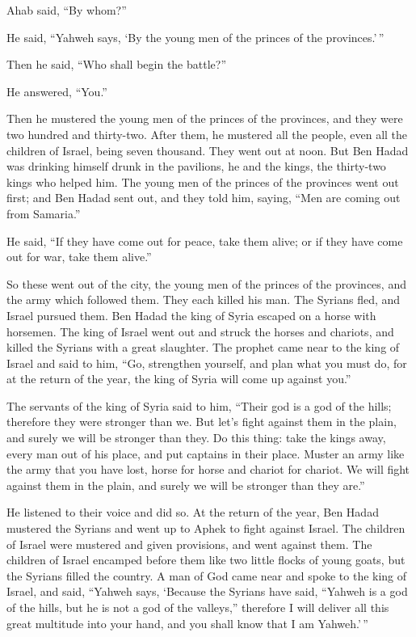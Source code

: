  Ahab said, ``By whom?''

He said, ``Yahweh says, `By the young men of the princes of the
provinces.'\,''

Then he said, ``Who shall begin the battle?''

He answered, ``You.''

 Then he mustered the young men of the princes of the
provinces, and they were two hundred and thirty-two. After them, he
mustered all the people, even all the children of Israel, being seven
thousand.  They went out at noon. But Ben Hadad was
drinking himself drunk in the pavilions, he and the kings, the
thirty-two kings who helped him.  The young men of the
princes of the provinces went out first; and Ben Hadad sent out, and
they told him, saying, ``Men are coming out from Samaria.''

 He said, ``If they have come out for peace, take them
alive; or if they have come out for war, take them alive.''

 So these went out of the city, the young men of the
princes of the provinces, and the army which followed them.
 They each killed his man. The Syrians fled, and Israel
pursued them. Ben Hadad the king of Syria escaped on a horse with
horsemen.  The king of Israel went out and struck the
horses and chariots, and killed the Syrians with a great slaughter.
 The prophet came near to the king of Israel and said to
him, ``Go, strengthen yourself, and plan what you must do, for at the
return of the year, the king of Syria will come up against you.''

 The servants of the king of Syria said to him, ``Their
god is a god of the hills; therefore they were stronger than we. But
let's fight against them in the plain, and surely we will be stronger
than they.  Do this thing: take the kings away, every man
out of his place, and put captains in their place. 
Muster an army like the army that you have lost, horse for horse and
chariot for chariot. We will fight against them in the plain, and surely
we will be stronger than they are.''

He listened to their voice and did so.  At the return of
the year, Ben Hadad mustered the Syrians and went up to Aphek to fight
against Israel.  The children of Israel were mustered and
given provisions, and went against them. The children of Israel encamped
before them like two little flocks of young goats, but the Syrians
filled the country.  A man of God came near and spoke to
the king of Israel, and said, ``Yahweh says, `Because the Syrians have
said, ``Yahweh is a god of the hills, but he is not a god of the
valleys,'' therefore I will deliver all this great multitude into your
hand, and you shall know that I am Yahweh.'\,''

